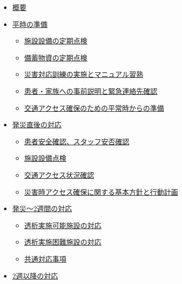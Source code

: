 \documentclass[
  japanese,
  letterpaper,
  DIV=11,
  numbers=noendperiod]{scrartcl}
\providecommand{\tightlist}{%
  \setlength{\itemsep}{0pt}\setlength{\parskip}{0pt}}
\begin{document}
\begin{itemize}
\tightlist
\item
  \hyperref[ux6982ux8981]{概要}
\item
  \hyperref[ux5e73ux6642ux306eux6e96ux5099]{平時の準備}

  \begin{itemize}
  \tightlist
  \item
    \hyperref[ux65bdux8a2dux8a2dux5099ux306eux5b9aux671fux70b9ux691c]{施設設備の定期点検}
  \item
    \hyperref[ux5099ux84c4ux7269ux8cc7ux306eux5b9aux671fux70b9ux691c]{備蓄物資の定期点検}
  \item
    \hyperref[ux707dux5bb3ux5bfeux5fdcux8a13ux7df4ux306eux5b9fux65bdux3068ux30deux30cbux30e5ux30a2ux30ebux7fd2ux719f]{災害対応訓練の実施とマニュアル習熟}
  \item
    \hyperref[ux60a3ux8005ux5bb6ux65cfux3078ux306eux4e8bux524dux8aacux660eux3068ux7dcaux6025ux9023ux7d61ux5148ux78baux8a8d]{患者・家族への事前説明と緊急連絡先確認}
  \item
    \hyperref[ux4ea4ux901aux30a2ux30afux30bbux30b9ux78baux4fddux306eux305fux3081ux306eux5e73ux5e38ux6642ux304bux3089ux306eux6e96ux5099]{交通アクセス確保のための平常時からの準備}
  \end{itemize}
\item
  \hyperref[ux767aux707dux76f4ux5f8cux306eux5bfeux5fdc]{発災直後の対応}

  \begin{itemize}
  \tightlist
  \item
    \hyperref[ux60a3ux8005ux5b89ux5168ux78baux8a8dux30b9ux30bfux30c3ux30d5ux5b89ux5426ux78baux8a8d]{患者安全確認、スタッフ安否確認}
  \item
    \hyperref[ux65bdux8a2dux8a2dux5099ux70b9ux691c]{施設設備点検}
  \item
    \hyperref[ux4ea4ux901aux30a2ux30afux30bbux30b9ux72b6ux6cc1ux78baux8a8d]{交通アクセス状況確認}
  \item
    \hyperref[ux707dux5bb3ux6642ux30a2ux30afux30bbux30b9ux78baux4fddux306bux95a2ux3059ux308bux57faux672cux65b9ux91ddux3068ux884cux52d5ux8a08ux753b]{災害時アクセス確保に関する基本方針と行動計画}
  \end{itemize}
\item
  \hyperref[ux767aux707d2ux9031ux9593ux306eux5bfeux5fdc]{発災〜2週間の対応}

  \begin{itemize}
  \tightlist
  \item
    \hyperref[ux900fux6790ux5b9fux65bdux53efux80fdux65bdux8a2dux306eux5bfeux5fdc]{透析実施可能施設の対応}
  \item
    \hyperref[ux900fux6790ux5b9fux65bdux56f0ux96e3ux65bdux8a2dux306eux5bfeux5fdc]{透析実施困難施設の対応}
  \item
    \hyperref[ux5171ux901aux5bfeux5fdcux4e8bux9805]{共通対応事項}
  \end{itemize}
\item
  \hyperref[2ux9031ux4ee5ux964dux306eux5bfeux5fdc]{2週以降の対応}


\end{itemize}
\end{document}
